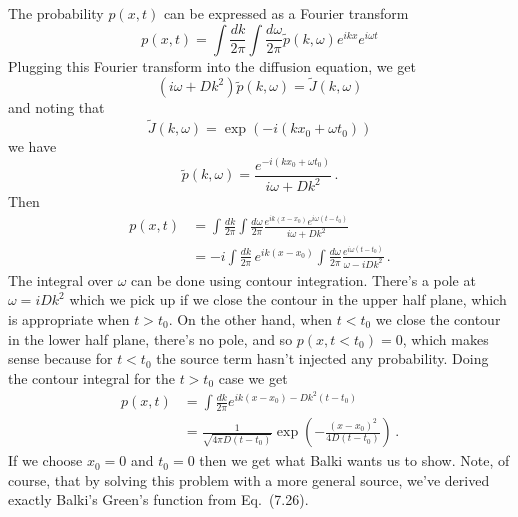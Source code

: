 The probability $p(x, t)$ can be expressed as a Fourier transform
\begin{equation*}
  p(x, t) = \int \frac{dk}{2\pi} \int \frac{d \omega}{2\pi} \tilde{p}(k, \omega)
  e^{i k x} e^{i \omega t}
\end{equation*}
Plugging this Fourier transform into the diffusion equation, we get
\begin{equation*}
  (i \omega + D k^2)\tilde{p}(k, \omega) = \tilde{J}(k, \omega)
\end{equation*}
and noting that
\begin{equation*}
  \tilde{J}(k, \omega) = \exp \left(-i (k x_0 + \omega t_0) \right)
\end{equation*}
we have
\begin{equation*}
  \tilde{p}(k, \omega) = \frac{e^{-i(kx_0 + \omega t_0)}}{i \omega + D k^2} \, .
\end{equation*}
Then
\begin{align*}
  p(x, t)
  &= \int \frac{dk}{2\pi}\int \frac{d\omega}{2\pi}
    \frac{e^{i k (x - x_0)} e^{i \omega (t - t_0)}}{i \omega + D k^2} \\
  &= -i \int \frac{dk}{2\pi} \, e^{i k (x - x_0)}
    \int \frac{d \omega}{2\pi} \frac{e^{i \omega (t - t_0)}}{\omega - i D k^2}
  \, .
\end{align*}
The integral over $\omega$ can be done using contour integration.
There's a pole at $\omega = i D k^2$ which we pick up if we close the contour in the upper half plane, which is appropriate when $t > t_0$.
On the other hand, when $t < t_0$ we close the contour in the lower half plane, there's no pole, and so $p(x, t < t_0) = 0$, which makes sense because for $t < t_0$ the source term hasn't injected any probability.
Doing the contour integral for the $t > t_0$ case we get
\begin{align*}
  p(x, t)
  &= \int \frac{dk}{2 \pi} e^{i k (x - x_0) - D k^2 (t - t_0)} \\
  &= \frac{1}{\sqrt{4 \pi D (t - t_0)}} \exp \left( - \frac{(x - x_0)^2}{4 D (t - t_0)} \right)
  \, .
\end{align*}
If we choose $x_0 = 0$ and $t_0 = 0$ then we get what Balki wants us to show.
Note, of course, that by solving this problem with a more general source, we've derived exactly Balki's Green's function from Eq.~(7.26).

